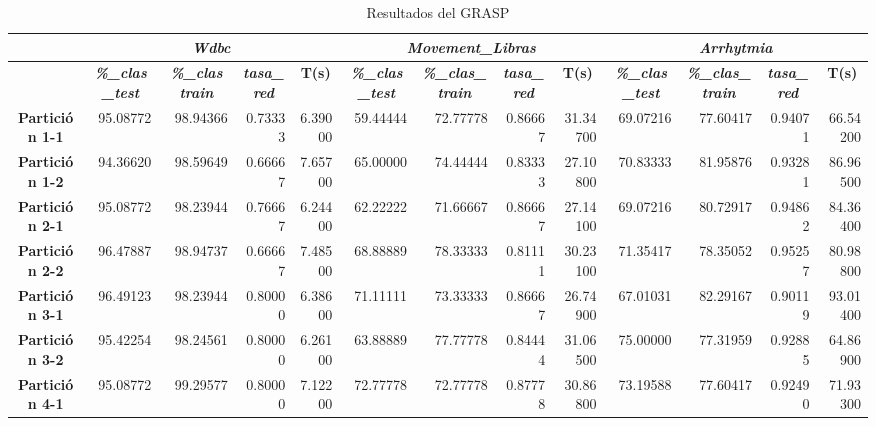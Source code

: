 \documentclass[a4paper,11pt]{article}
\begin{document}
  \begin{table}[H]
  \caption*{Resultados del GRASP}
  \begin{adjustbox}{width=1.1\textwidth}
  \begin{tabular}{|c|r|r|r|r|r|r|r|r|r|r|r|r|}
  \hline
  \multicolumn{1}{|l|}{} & \multicolumn{ 4}{c|}{\textbf{\textit{Wdbc}}} & \multicolumn{ 4}{c|}{\textbf{\textit{Movement\_Libras}}} & \multicolumn{ 4}{c|}{\textbf{\textit{Arrhytmia}}} \\ \hline
  \multicolumn{1}{|l|}{} & \multicolumn{1}{c|}{\textbf{\textit{\%\_clas\_test}}} & \multicolumn{1}{c|}{\textbf{\textit{\%\_clas train}}} & \multicolumn{1}{c|}{\textbf{\textit{tasa\_red}}} & \multicolumn{1}{c|}{\textbf{T(s)}} & \multicolumn{1}{c|}{\textbf{\textit{\%\_clas\_test}}} & \multicolumn{1}{c|}{\textbf{\textit{\%\_clas\_train}}} & \multicolumn{1}{c|}{\textbf{\textit{tasa\_red}}} & \multicolumn{1}{c|}{\textbf{T(s)}} & \multicolumn{1}{c|}{\textbf{\textit{\%\_clas\_test}}} & \multicolumn{1}{c|}{\textbf{\textit{\%\_clas\_train}}} & \multicolumn{1}{c|}{\textbf{\textit{tasa\_red}}} & \multicolumn{1}{c|}{\textbf{T(s)}} \\ \hline
  \textbf{Partición 1-1} & 95.08772 & 98.94366 & 0.73333 & 6.39000 & 59.44444 & 72.77778 & 0.86667 & 31.34700 & 69.07216 & 77.60417 & 0.94071 & 66.54200 \\ \hline
  \textbf{Partición 1-2} & 94.36620 & 98.59649 & 0.66667 & 7.65700 & 65.00000 & 74.44444 & 0.83333 & 27.10800 & 70.83333 & 81.95876 & 0.93281 & 86.96500 \\ \hline
  \textbf{Partición 2-1} & 95.08772 & 98.23944 & 0.76667 & 6.24400 & 62.22222 & 71.66667 & 0.86667 & 27.14100 & 69.07216 & 80.72917 & 0.94862 & 84.36400 \\ \hline
  \textbf{Partición 2-2} & 96.47887 & 98.94737 & 0.66667 & 7.48500 & 68.88889 & 78.33333 & 0.81111 & 30.23100 & 71.35417 & 78.35052 & 0.95257 & 80.98800 \\ \hline
  \textbf{Partición 3-1} & 96.49123 & 98.23944 & 0.80000 & 6.38600 & 71.11111 & 73.33333 & 0.86667 & 26.74900 & 67.01031 & 82.29167 & 0.90119 & 93.01400 \\ \hline
  \textbf{Partición 3-2} & 95.42254 & 98.24561 & 0.80000 & 6.26100 & 63.88889 & 77.77778 & 0.84444 & 31.06500 & 75.00000 & 77.31959 & 0.92885 & 64.86900 \\ \hline
  \textbf{Partición 4-1} & 95.08772 & 99.29577 & 0.80000 & 7.12200 & 72.77778 & 72.77778 & 0.87778 & 30.86800 & 73.19588 & 77.60417 & 0.92490 & 71.93300 \\ \hline

\end{tabular}
\end{adjustbox}
\end{table}
\end{document}
